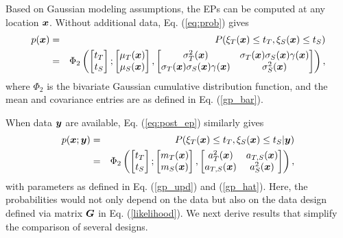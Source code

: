 \documentclass[aoas]{imsart}
\begin{document}
Based on Gaussian modeling assumptions, the EPs can be computed at any
location ${\boldsymbol x}$. Without additional data, Eq.  (\ref{eq:prob}) gives
\begin{eqnarray}\label{eq:prob_mv0}
 p(\bx) &=& P(\xi_T(\bx) \leq t_T, \xi_S(\bx) \leq t_S) \nonumber \\
 &=& \Phi_2 \begin{pmatrix} 
\begin{bmatrix} t_T\\
t_S
\end{bmatrix};
\begin{bmatrix} \mu_{T}(\bx)\\
\mu_{S}(\bx)
\end{bmatrix},\begin{bmatrix}
\sigma_{T}^2(\bx) & \sigma_{T}(\bx)\sigma_{S}(\bx) \gamma(\bx)  \\
\sigma_{T}(\bx)\sigma_{S}(\bx) \gamma(\bx)  & \sigma_{S}^2(\bx)  
\end{bmatrix}\end{pmatrix},
\end{eqnarray}
where $\Phi_2$ is the bivariate Gaussian cumulative distribution
function, and the mean and covariance entries are as defined in Eq. (\ref{gp_bar}).

When data ${\boldsymbol y}$ are available, Eq. (\ref{eq:post_ep}) similarly gives
\begin{eqnarray}\label{eq:prob_mv}
 p(\bx;\by) &=& P(\xi_T(\bx) \leq t_T, \xi_S(\bx) \leq t_S |\by)
 \nonumber \\
 &=& \Phi_2 \begin{pmatrix} 
\begin{bmatrix} t_T\\
t_S
\end{bmatrix};
\begin{bmatrix} m_{T}(\bx)\\
m_{S}(\bx)
\end{bmatrix},\begin{bmatrix}
a_{T}^2(\bx) & a_{T,S}(\bx)  \\
a_{T,S}(\bx)  & a_{S}^2(\bx)  
\end{bmatrix}\end{pmatrix},
\end{eqnarray}
with parameters as defined in Eq. (\ref{gp_upd}) and (\ref{gp_hat}). Here, the probabilities would not only depend on the data but also on the data design defined via matrix ${\boldsymbol G}$ in Eq. (\ref{likelihood}). We next derive results that simplify the comparison of several designs.
\end{document}
